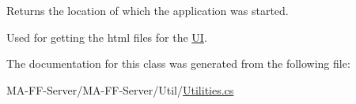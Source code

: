 Returns the location of which the application was started. 

Used for getting the html files for the \hyperlink{namespace_web_analyzer_1_1_u_i}{U\+I}.

The documentation for this class was generated from the following file\+:\begin{DoxyCompactItemize}
\item 
M\+A-\/\+F\+F-\/\+Server/\+M\+A-\/\+F\+F-\/\+Server/\+Util/\hyperlink{_utilities_8cs}{Utilities.\+cs}\end{DoxyCompactItemize}
